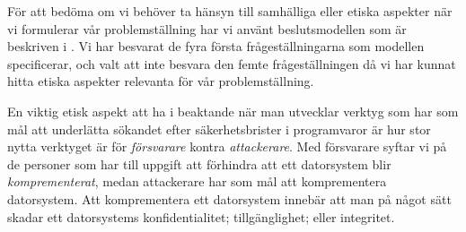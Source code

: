 

För att bedöma om vi behöver ta hänsyn till samhälliga eller etiska aspekter när vi formulerar vår problemställning har vi använt beslutsmodellen som är beskriven i \cite{föreskrifter}.
Vi har besvarat de fyra första frågeställningarna som modellen specificerar, och valt att inte besvara den femte frågeställningen då vi har kunnat hitta etiska aspekter relevanta för vår problemställning.



En viktig etisk aspekt att ha i beaktande när man utvecklar verktyg som har som mål att underlätta sökandet efter säkerhetsbrister i programvaror är hur stor nytta verktyget är för \emph{försvarare} kontra \emph{attackerare}.
Med försvarare syftar vi på de personer som har till uppgift att förhindra att ett datorsystem blir \emph{komprementerat}, medan attackerare har som mål att komprementera datorsystem.
Att komprementera ett datorsystem innebär att man på något sätt skadar ett datorsystems konfidentialitet; tillgänglighet; eller integritet.

